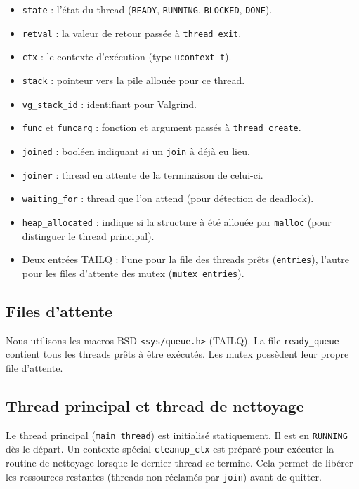 \documentclass[12pt,a4paper]{article}
\begin{document}
\begin{itemize}
    \item \texttt{state} : l’état du thread (\texttt{READY}, \texttt{RUNNING}, \texttt{BLOCKED}, \texttt{DONE}).
    \item \texttt{retval} : la valeur de retour passée à \texttt{thread\_exit}.
    \item \texttt{ctx} : le contexte d’exécution (type \texttt{ucontext\_t}).
    \item \texttt{stack} : pointeur vers la pile allouée pour ce thread.
    \item \texttt{vg\_stack\_id} : identifiant pour Valgrind.
    \item \texttt{func} et \texttt{funcarg} : fonction et argument passés à \texttt{thread\_create}.
    \item \texttt{joined} : booléen indiquant si un \texttt{join} à déjà eu lieu.
    \item \texttt{joiner} : thread en attente de la terminaison de celui-ci.
    \item \texttt{waiting\_for} : thread que l’on attend (pour détection de deadlock).
    \item \texttt{heap\_allocated} : indique si la structure à été allouée par \texttt{malloc} (pour distinguer le thread principal).
    \item Deux entrées TAILQ : l’une pour la file des threads prêts (\texttt{entries}), l’autre pour les files d’attente des mutex (\texttt{mutex\_entries}).
\end{itemize}

\subsection{Files d’attente}

Nous utilisons les macros BSD \texttt{<sys/queue.h>} (TAILQ). La file \texttt{ready\_queue} contient tous les threads prêts à être exécutés. Les mutex possèdent leur propre file d’attente.

\subsection{Thread principal et thread de nettoyage}

Le thread principal (\texttt{main\_thread}) est initialisé statiquement. Il est en \texttt{RUNNING} dès le départ. Un contexte spécial \texttt{cleanup\_ctx} est préparé pour exécuter la routine de nettoyage lorsque le dernier thread se termine. Cela permet de libérer les ressources restantes (threads non réclamés par \texttt{join}) avant de quitter.
\end{document}
